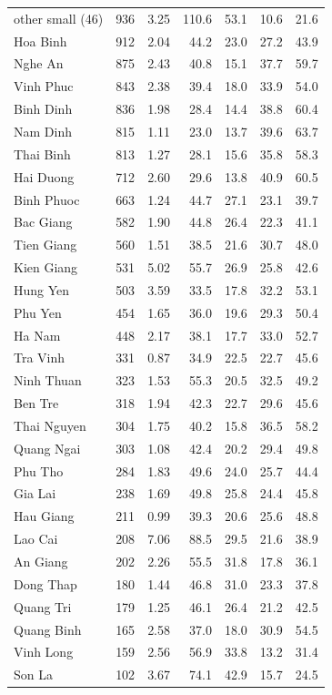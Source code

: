 {\begin{longtable}{lrrrrrr}
other small (46) & 936 & 3.25 & 110.6 & 53.1 & 10.6 & 21.6 \\
Hoa Binh & 912 & 2.04 & 44.2 & 23.0 & 27.2 & 43.9 \\
Nghe An & 875 & 2.43 & 40.8 & 15.1 & 37.7 & 59.7 \\
Vinh Phuc & 843 & 2.38 & 39.4 & 18.0 & 33.9 & 54.0 \\
Binh Dinh & 836 & 1.98 & 28.4 & 14.4 & 38.8 & 60.4 \\
Nam Dinh & 815 & 1.11 & 23.0 & 13.7 & 39.6 & 63.7 \\
Thai Binh & 813 & 1.27 & 28.1 & 15.6 & 35.8 & 58.3 \\
Hai Duong & 712 & 2.60 & 29.6 & 13.8 & 40.9 & 60.5 \\
Binh Phuoc & 663 & 1.24 & 44.7 & 27.1 & 23.1 & 39.7 \\
Bac Giang & 582 & 1.90 & 44.8 & 26.4 & 22.3 & 41.1 \\
Tien Giang & 560 & 1.51 & 38.5 & 21.6 & 30.7 & 48.0 \\
Kien Giang & 531 & 5.02 & 55.7 & 26.9 & 25.8 & 42.6 \\
Hung Yen & 503 & 3.59 & 33.5 & 17.8 & 32.2 & 53.1 \\
Phu Yen & 454 & 1.65 & 36.0 & 19.6 & 29.3 & 50.4 \\
Ha Nam & 448 & 2.17 & 38.1 & 17.7 & 33.0 & 52.7 \\
Tra Vinh & 331 & 0.87 & 34.9 & 22.5 & 22.7 & 45.6 \\
Ninh Thuan & 323 & 1.53 & 55.3 & 20.5 & 32.5 & 49.2 \\
Ben Tre & 318 & 1.94 & 42.3 & 22.7 & 29.6 & 45.6 \\
Thai Nguyen & 304 & 1.75 & 40.2 & 15.8 & 36.5 & 58.2 \\
Quang Ngai & 303 & 1.08 & 42.4 & 20.2 & 29.4 & 49.8 \\
Phu Tho & 284 & 1.83 & 49.6 & 24.0 & 25.7 & 44.4 \\
Gia Lai & 238 & 1.69 & 49.8 & 25.8 & 24.4 & 45.8 \\
Hau Giang & 211 & 0.99 & 39.3 & 20.6 & 25.6 & 48.8 \\
Lao Cai & 208 & 7.06 & 88.5 & 29.5 & 21.6 & 38.9 \\
An Giang & 202 & 2.26 & 55.5 & 31.8 & 17.8 & 36.1 \\
Dong Thap & 180 & 1.44 & 46.8 & 31.0 & 23.3 & 37.8 \\
Quang Tri & 179 & 1.25 & 46.1 & 26.4 & 21.2 & 42.5 \\
Quang Binh & 165 & 2.58 & 37.0 & 18.0 & 30.9 & 54.5 \\
Vinh Long & 159 & 2.56 & 56.9 & 33.8 & 13.2 & 31.4 \\
Son La & 102 & 3.67 & 74.1 & 42.9 & 15.7 & 24.5 \\
\end{longtable}}
